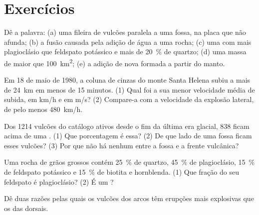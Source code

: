 \section{Exercícios}

\begin{exercise}[$\star$]\label{exo:g12:subduction-magmatism:1}
Dê a palavra: (a) uma fileira de vulcões paralela a uma fossa, na placa que
não afunda; (b) a fusão causada pela adição de água a uma rocha; (c) uma
 com mais plagioclásio que feldspato potássico e mais de
\qty{20}{\percent} de quartzo; (d) uma massa de  maior que
\qty{100}{km^2}; (e) a adição de nova  formada a partir do
manto.
\end{exercise}

\begin{exercise}[$\star$]\label{exo:g12:subduction-magmatism:2}
Em 18 de maio de 1980, a coluna de cinzas do monte Santa Helena subiu a mais
de \qty{24}{km} em menos de 15 minutos. (1) Qual foi a sua menor velocidade
média de subida, em \unit{km/h} e em \unit{m/s}? (2) Compare-a com a
velocidade da explosão lateral, de pelo menos \qty{480}{km/h}.
\end{exercise}

\begin{exercise}[$\star$]\label{exo:g12:subduction-magmatism:3}
Dos 1214 vulcões do catálogo ativos desde o fim da última era glacial, 838
ficam acima de uma . (1) Que porcentagem é essa? (2) De que
lado de uma fossa ficam esses vulcões? (3) Por que não há nenhum entre a
fossa e a frente vulcânica?
\end{exercise}

\begin{exercise}[$\star$]\label{exo:g12:subduction-magmatism:4}
Uma rocha de grãos grossos contém \qty{25}{\percent} de quartzo,
\qty{45}{\percent} de plagioclásio, \qty{15}{\percent} de feldspato
potássico e \qty{15}{\percent} de biotita e hornblenda. (1) Que fração do
seu feldspato é plagioclásio? (2) É um ?
\end{exercise}

\begin{exercise}[$\star$]\label{exo:g12:subduction-magmatism:5}
Dê duas razões pelas quais os vulcões dos arcos têm erupções mais
explosivas que os das dorsais.
\end{exercise}

